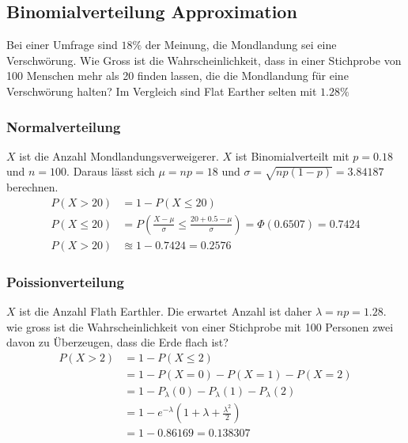 \subsection{Binomialverteilung Approximation}
Bei einer Umfrage sind $18\%$ der Meinung, die Mondlandung sei eine Verschwörung. Wie Gross ist die Wahrscheinlichkeit, dass in einer Stichprobe von 100 Menschen mehr als 20 finden lassen, die die Mondlandung für eine Verschwörung halten? Im Vergleich sind Flat Earther selten mit $1.28\%$
\subsubsection{Normalverteilung}\label{approx_normal}
$X$ ist die Anzahl Mondlandungsverweigerer. $X$ ist Binomialverteilt mit $p=0.18$ und $n=100$. Daraus lässt sich $\mu=np = 18$ und $\sigma = \sqrt{np(1-p)} = 3.84187$ berechnen.
\begin{align*}
	P(X \gt 20) &= 1 - P(X \le 20) \\
	P(X \le 20) &= P\left(\frac{X - \mu}{\sigma} \le \frac{20 + 0.5 - \mu}{\sigma}\right) = \Phi(0.6507) = 0.7424\\
	P(X \gt 20) &\approxeq 1 - 0.7424 = 0.2576
\end{align*}

\subsubsection{Poissionverteilung}\label{approx_poission}
$X$ ist die Anzahl Flath Earthler. Die erwartet Anzahl ist daher $\lambda = np = 1.28$. wie gross ist die Wahrscheinlichkeit von einer Stichprobe mit 100 Personen zwei davon zu Überzeugen, dass die Erde flach ist?
\begin{align*}
	P(X \gt 2) &= 1 - P(X \le 2) \\
	&= 1 - P(X =0) - P(X=1) - P(X=2) \\
	&= 1-P_\lambda(0) -P_\lambda(1)-P_\lambda(2)\\
	&= 1 - e^{-\lambda}\left(1 + \lambda + \frac{\lambda^2}{2}\right)\\
	&= 1 - 0.86169 = 0.138307
\end{align*}

